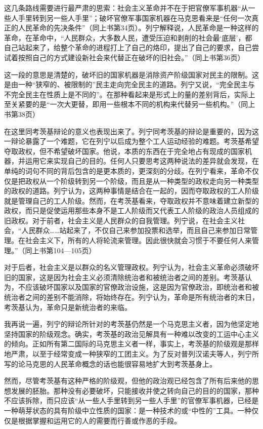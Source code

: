 \documentclass[UTF8, 12pt, a4paper]{ctexrep}
\begin{document}
这几条路线需要进行最严肃的思索：社会主义革命并不在于把官僚军事机器“从一些人手里转到另一些人手里”；破坏官僚军事国家机器在马克思看来是“任何一次真正的人民革命的先决条件”（同上书第34页）。列宁解释说，人民革命是一种这样的革命，在革命中，“人民群众，大多数人民，遭受压迫和剥削的社会最‘底层’，都自己站起来了，给整个革命的进程打上了自己的烙印，提出了自己的要求，自己尝试着按照自己的方式建设新社会来代替正在破坏的旧社会。”（同上书第36页）

这一段的意思是清楚的，破坏旧的国家机器是消除资产阶级国家对民主的限制。这是由一种“狭窄的、被限制的”民主走向完全民主的道路。列宁又说，“完全民主与不完全民主在性质上是不同的”。在那种看起来是形式上的量的差别背后，实际上至关紧要的是“一次大更替，即用一些根本不同的机构来代替另一些机构。”（同上书第38页）

在这里同考茨基辩论的意义也表现出来了。列宁同考茨基的辩论是重要的，因为这一辩论暴露了一个难题，它在列宁以后成为整个工人运动经验的难题。考茨基希望夺取政权，但不希望破坏国家。他说，本质的东西在于完全地占有现成的国家机器，并运用它来实现自己的目的。任何人只要思考这两种说法的差异就会发现，在单纯的词句不同的背后包含的是更本质的，更深刻的分歧。在列宁看来，革命不仅仅是把政权从一个阶级转到另一个阶级，而且是从一种类型的政权走向另一种类型的政权的道路。列宁认为，这两种事情是结合在一起的，因而夺取政权的工人阶级就是管理自己的工人阶级。然而，在考茨基看来，夺取政权并不意味着建立新型的政权，而只是促使运用那些本身不是工人阶级而又代表工人阶级的政治人员组成的旧政权。对于前者，社会主义是人民群众的自我管理。列宁说，在社会主义社会，“人民群众……站起来了，不仅自己来参加投票和选举，而且自己来参加日常管理。在社会主义下，所有的人将轮流来管理。因此很快就会习惯于不要任何人来管理。”（同上书第104—105页）

对于后者，社会主义是以群众的名义管理政权。列宁认为，社会主义革命必须破坏旧的国家，这是因为社会主义必须清除统治者和被统治者之间的差别。考茨基认为，不应该破坏国家以及国家的官僚政治设施，这是因为官僚政治，即统治者和被统治者之间的差别不能消除，将始终存在。列宁认为，革命是所有统治者的末日，考茨基认为，革命只是新统治者的来临。

我再说一遍，列宁的辩论所针对的考茨基仍然是一个马克思主义者，因为他坚定地坚持国家的阶级观念。确实，考茨基的政治见解具有一种难以改变的工运中心主义的倾向。正如所有第二国际的马克思主义者一样，事实上，考茨基的阶级观是那样地严肃，以至于经常变成一种狭窄的工团主义。为了反对普列汉诺夫等人，列宁所写的论马克思的人民革命概念的话也能很容易地扩大到考茨基身上。

然而，尽管考茨基有这种严格的阶级观，但他的政治观已经包含了所有后来他的思想发展的胚胎。那种没有必要破坏，只能接收并使之转向自己的目的的国家，那种不应该拆除，而只应该“从一些人手里转到另一些人手里”的官僚军事机器，已经是一种萌芽状态的具有阶级中立性质的国家：是一种技术的或“中性的”工具。一种仅仅是根据掌握和运用它的人的需要而行善或作恶的手段。
\end{document}

